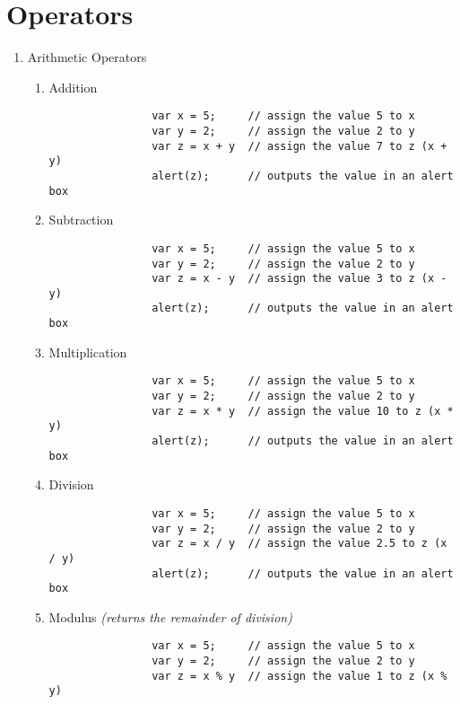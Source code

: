 \documentclass{article}
\begin{document}
  \section{Operators}
      \begin{enumerate}
        \item Arithmetic Operators
          \begin{enumerate}
            \item Addition
              \begin{lstlisting}
                var x = 5;     // assign the value 5 to x
                var y = 2;     // assign the value 2 to y
                var z = x + y  // assign the value 7 to z (x + y)
                alert(z);      // outputs the value in an alert box
              \end{lstlisting}
            \item Subtraction
              \begin{lstlisting}
                var x = 5;     // assign the value 5 to x
                var y = 2;     // assign the value 2 to y
                var z = x - y  // assign the value 3 to z (x - y)
                alert(z);      // outputs the value in an alert box
              \end{lstlisting}
            \item Multiplication
              \begin{lstlisting}
                var x = 5;     // assign the value 5 to x
                var y = 2;     // assign the value 2 to y
                var z = x * y  // assign the value 10 to z (x * y)
                alert(z);      // outputs the value in an alert box
              \end{lstlisting}
            \item Division
              \begin{lstlisting}
                var x = 5;     // assign the value 5 to x
                var y = 2;     // assign the value 2 to y
                var z = x / y  // assign the value 2.5 to z (x / y)
                alert(z);      // outputs the value in an alert box
              \end{lstlisting}
            \item Modulus \textit{(returns the remainder of division)}
              \begin{lstlisting}
                var x = 5;     // assign the value 5 to x
                var y = 2;     // assign the value 2 to y
                var z = x % y  // assign the value 1 to z (x % y)

\end{lstlisting}
\end{enumerate}
\end{enumerate}
\end{document}
